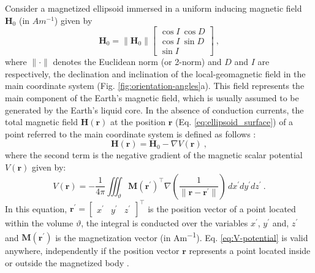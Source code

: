 \documentclass[gmd, manuscript]{copernicus}
\begin{document}
Consider a magnetized ellipsoid immersed in
a uniform inducing magnetic field $\mathbf{H}_{0}$ (in $\unit{Am^{-1}}$)
given by
\begin{equation}
\mathbf{H}_{0} = \| \mathbf{H}_{0} \| \left[
\begin{array}{c}
\cos I \: \cos D \\
\cos I \: \sin D \\
\sin I
\end{array}
\right] \: ,
\label{eq:H0}
\end{equation}
where $\| \cdot \|$ denotes the Euclidean norm (or 2-norm) and
$D$ and $I$ are respectively, the declination and inclination of the
local-geomagnetic field in the main coordinate system
(Fig. \ref{fig:orientation-angles}a).
This field represents the main component of the
Earth's magnetic field, which is usually assumed to be generated
by the Earth's liquid core.
In the absence of conduction currents,
the total magnetic field $\mathbf{H}(\mathbf{r})$
at the position $\mathbf{r}$ (Eq. \ref{eq:ellipsoid_surface})
of a point referred to the main
coordinate system is defined as follows \citep{sharma1966,
eskola1980, reitz1992, sttraton2007}:
\begin{equation}
\mathbf{H}(\mathbf{r}) = \mathbf{H}_{0} - \nabla V(\mathbf{r}) \: ,
\label{eq:H}
\end{equation}
where the second term is the negative gradient of
the magnetic scalar potential $V(\mathbf{r})$ given by:
\begin{equation}
V(\mathbf{r}) = -\frac{1}{4\pi} \iiint_{\vartheta}
\mathbf{M}(\mathbf{r}^{\prime})^{\top}
\nabla \left(
\frac{1}{\| \mathbf{r} - \mathbf{r}^{\prime} \|}
\right) \, dx^{\prime}dy^{\prime}dz^{\prime} \: .
\label{eq:V-potential}
\end{equation}
In this equation, $\mathbf{r}^{\prime} = [\begin{array}{ccc}
x^{\prime} & y^{\prime} & z^{\prime} \end{array} ]^{\top}$
is the position vector of a point located within the volume $\vartheta$,
the integral is conducted over the variables
$x^{\prime}$, $y^{\prime}$ and, $z^{\prime}$ and
$\mathbf{M}(\mathbf{r}^{\prime})$ is the magnetization vector
(in \unit{Am^{-1}}).
Eq. \ref{eq:V-potential} is valid anywhere,
independently if the position vector $\mathbf{r}$ represents
a point located inside or outside the magnetized body
\citep{dubois1896, reitz1992, sttraton2007}.
\end{document}
